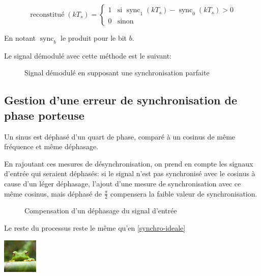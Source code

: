\documentclass{article}
\begin{document}
$$
\operatorname{reconstitué}(kT_s) = \begin{cases}
    1 & \text{si } \operatorname{sync}_1(kT_s) - \operatorname{sync}_0(kT_s) > 0 \\
    0 & \text{sinon}
\end{cases}
$$

En notant $\operatorname{sync}_b$ le produit pour le bit $b$.

Le signal démodulé avec cette méthode est le suivant:


\begin{figure}
\end{figure}

\begin{figure}[H]
	\centering

	\caption{Signal démodulé en supposant une synchronisation parfaite}
	\label{fig:synchro-parfaite}
\end{figure}



\subsection{Gestion d'une erreur de synchronisation de phase porteuse}

Un sinus est déphasé d'un quart de phase, comparé à un cosinus de même fréquence et même déphasage.

En rajoutant ces mesures de désynchronisation, on prend en compte les signaux d'entrée qui seraient déphasés: si le signal n'est pas synchronisé avec le cosinus à cause d'un léger déphasage, l'ajout d'une mesure de synchronisation avec ce même cosinus, mais déphasé de $\frac{\pi}{2}$ compensera la faible valeur de synchronisation.

\begin{figure}[H]
	\centering
	\caption{Compensation d'un déphasage du signal d'entrée}
	\label{fig:compensation-dephasage}
\end{figure}

Le reste du processus reste le même qu'en \ref{synchro-ideale}

\begin{figure}

\end{figure}


\begin{center}
    \includegraphics[width=0.125\textwidth]{frog.jpg}
\end{center}
\end{document}
